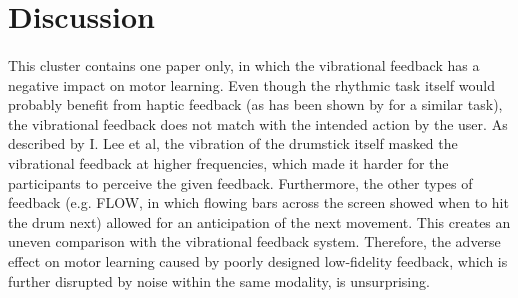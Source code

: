 
\section{Discussion}

\paragraph{}
This cluster contains one paper only, in which the vibrational feedback has a negative impact on motor learning. Even though the rhythmic task itself would probably benefit from haptic feedback (as has been shown by \cite{Graham2008} for a similar task), the vibrational feedback does not match with the intended action by the user. As described by I. Lee et al, the vibration of the drumstick itself masked the vibrational feedback at higher frequencies, which made it harder for the participants to perceive the given feedback. Furthermore, the other types of feedback (e.g. FLOW, in which flowing bars across the screen showed when to hit the drum next) allowed for an anticipation of the next movement. This creates an uneven comparison with the vibrational feedback system. Therefore, the adverse effect on motor learning caused by poorly designed low-fidelity feedback, which is further disrupted by noise within the same modality, is unsurprising.

